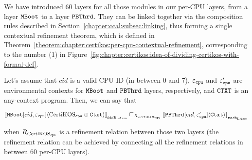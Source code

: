 We have introduced 60 layers for all those modules in our per-CPU layers, from a layer ${\mathrm{\texttt{MBoot}}}$  to a layer 
${{\mathrm{\texttt{PBThrd}}}}$.
They can be linked together via the composition rules described in Section~\ref{chapter:ccal:subsec:linking},
thus forming a single contextual refinement theorem, which is defined in Theorem~\ref{theorem:chapter:certikos:per-cpu-contextual-refinement},
corresponding to the number (1) in Figure~\ref{fig:chapter:certikos:idea-of-dividing-certikos-with-formal-def}.
\begin{theorem}
\label{theorem:chapter:certikos:per-cpu-contextual-refinement}
Let's assume that $cid$ is a valid CPU ID (in between 0 and 7), ${\varepsilon}_{{\mathrm{\texttt{cpu}}}}$ and  ${\varepsilon}'_{{\mathrm{\texttt{cpu}}}}$ are 
environmental contexts for ${\mathrm{\texttt{MBoot}}}$  and ${{\mathrm{\texttt{PBThrd}}}}$ layers, respectively, and ${\mathrm{\texttt{CTXT}}}$ is an any-context program. Then, we can say that
\begin{center}
${[\![{{\mathrm{\texttt{MBoot}}}[cid, {\varepsilon}_{{\mathrm{\texttt{cpu}}}}]} \langle {\mathrm{CertiKOS}_{{\mathrm{\texttt{cpu}}}} \oplus {\mathrm{\texttt{Ctxt}}}} \rangle]\!]}_{{\mathrm{\texttt{mach}}}_{\mathrm{LAsm}}} \sqsubseteq_{R_{\mathrm{CertiKOS}_{\mathrm{\texttt{cpu}}}}} {[\![{{{\mathrm{\texttt{PBThrd}}}}[cid, {\varepsilon}'_{{\mathrm{\texttt{cpu}}}}]} \langle {{\mathrm{\texttt{Ctxt}}}} \rangle]\!]}_{{{\mathrm{\texttt{mach}}}_{\mathrm{LAsm}}}}$
\end{center}
when ${R_{\mathrm{CertiKOS}_{\mathrm{\texttt{cpu}}}}}$ is a refinement relation between those two layers (the refinement relation can be achieved by 
connecting all the refinement relations in between 60 per-CPU layers).
\end{theorem}



%
